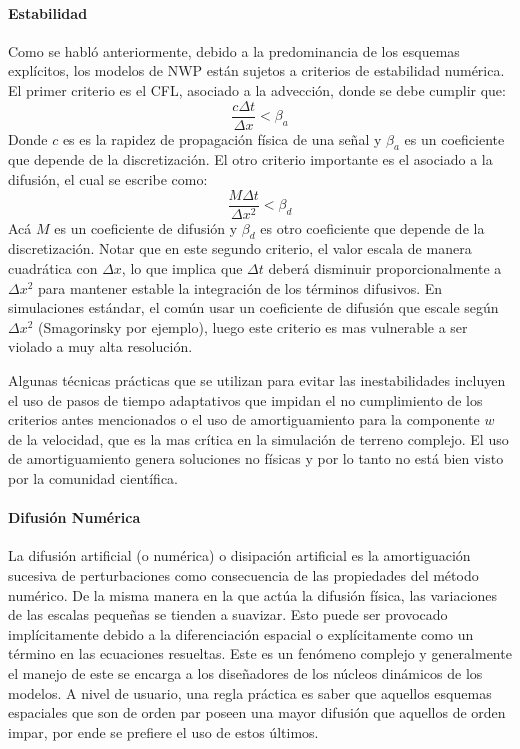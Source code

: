 \paragraph{Estabilidad} Como se habló anteriormente, debido a la predominancia de los esquemas explícitos, los modelos de NWP están sujetos a criterios de estabilidad numérica. El primer criterio es el CFL, asociado a la advección, donde se debe cumplir que:
\begin{equation}\label{eq:cfl}
\frac{c\Delta t}{\Delta x}<\beta_a
\end{equation}
Donde $c$ es es la rapidez de propagación física de una señal y $\beta_a$ es un coeficiente que depende de la discretización. El otro criterio importante es el asociado a la difusión, el cual se escribe como:
\begin{equation}\label{eq:cfl_d}
\frac{M\Delta t}{\Delta x^2}<\beta_d
\end{equation}
Acá $M$ es un coeficiente de difusión y $\beta_d$ es otro coeficiente que depende de la discretización. Notar que en este segundo criterio, el valor escala de manera cuadrática con $\Delta x$, lo que implica que $\Delta t$ deberá disminuir proporcionalmente a $\Delta x^2$ para mantener estable la integración de los términos difusivos. En simulaciones estándar, el común usar un coeficiente de difusión que escale según $\Delta x^2$ (Smagorinsky por ejemplo), luego este criterio es mas vulnerable a ser violado a muy alta resolución.

Algunas técnicas prácticas que se utilizan para evitar las inestabilidades incluyen el uso de pasos de tiempo adaptativos que impidan el no cumplimiento de los criterios antes mencionados o el uso de amortiguamiento para la componente $w$ de la velocidad, que es la mas crítica en la simulación de terreno complejo. El uso de amortiguamiento genera soluciones no físicas y por lo tanto no está bien visto por la comunidad científica.

\paragraph{Difusión Numérica} La difusión artificial (o numérica) o disipación artificial es la amortiguación sucesiva de perturbaciones como consecuencia de las propiedades del método numérico. De la misma manera en la que actúa la difusión física, las variaciones de las escalas pequeñas se tienden a suavizar. Esto puede ser provocado implícitamente debido a la diferenciación espacial o explícitamente como un término en las ecuaciones resueltas. Este es un fenómeno complejo y generalmente el manejo de este se encarga a los diseñadores de los núcleos dinámicos de los modelos. A nivel de usuario, una regla práctica es saber que aquellos esquemas espaciales que son de orden par poseen una mayor difusión que aquellos de orden impar, por ende se prefiere el uso de estos últimos.

